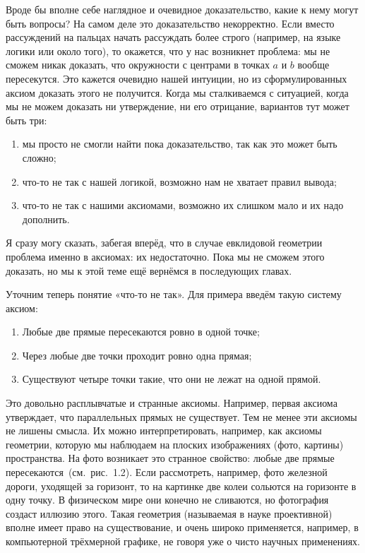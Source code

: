 Вроде бы вполне себе наглядное и очевидное доказательство, какие к нему могут быть вопросы? На самом деле это доказательство некорректно. Если вместо рассуждений на пальцах начать рассуждать более строго (например, на языке логики или около того), то окажется, что у нас возникнет проблема: мы не сможем никак доказать, что окружности с центрами в точках $a$ и $b$ вообще пересекутся. Это кажется очевидно нашей интуиции, но из сформулированных аксиом доказать этого не получится. Когда мы сталкиваемся с ситуацией, когда мы не можем доказать ни утверждение, ни его отрицание, вариантов тут может быть три:

\begin{enumerate}
\item мы просто не смогли найти пока доказательство, так как это может быть сложно;
\item что-то не так с нашей логикой, возможно нам не хватает правил вывода;
\item что-то не так с нашими аксиомами, возможно их слишком мало и их надо дополнить.
\end{enumerate}

Я сразу могу сказать, забегая вперёд, что в случае евклидовой геометрии проблема именно в аксиомах: их недостаточно. Пока мы не сможем этого доказать, но мы к этой теме ещё вернёмся в последующих главах.

Уточним теперь понятие «что-то не так». Для примера введём такую систему аксиом:

\begin{enumerate}
\item Любые две прямые пересекаются ровно в одной точке;
\item Через любые две точки проходит ровно одна прямая;
\item Существуют четыре точки такие, что они не лежат на одной прямой.
\end{enumerate}

Это довольно расплывчатые и странные аксиомы. Например, первая аксиома утверждает, что параллельных прямых не существует. Тем не менее эти аксиомы не лишены смысла. Их можно интерпретировать, например, как аксиомы геометрии, которую мы наблюдаем на плоских изображениях (фото, картины) пространства. На фото возникает это странное свойство: любые две прямые пересекаются~(см.~рис.~1.2). Если рассмотреть, например, фото железной дороги, уходящей за горизонт, то на картинке две колеи сольются на горизонте в одну точку. В физическом мире они конечно не сливаются, но фотография создаст иллюзию этого. Такая геометрия (называемая в науке проективной) вполне имеет право на существование, и очень широко применяется, например, в компьютерной трёхмерной графике, не говоря уже о чисто научных применениях.

